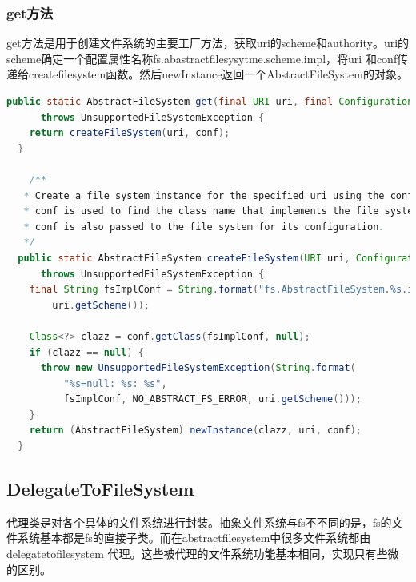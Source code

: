 \subsubsection{get方法}
get方法是用于创建文件系统的主要工厂方法，获取uri的scheme和authority。uri的scheme确定一个配置属性名称fs.abastractfilesysytme.scheme.impl，将uri 和conf传递给createfilesystem函数。然后newInstance返回一个AbstractFileSystem的对象。
\begin{lstlisting}[language=Java]
  public static AbstractFileSystem get(final URI uri, final Configuration conf)
      throws UnsupportedFileSystemException {
    return createFileSystem(uri, conf);
  }

    /**
   * Create a file system instance for the specified uri using the conf. The
   * conf is used to find the class name that implements the file system. The
   * conf is also passed to the file system for its configuration.
   */
  public static AbstractFileSystem createFileSystem(URI uri, Configuration conf)
      throws UnsupportedFileSystemException {
    final String fsImplConf = String.format("fs.AbstractFileSystem.%s.impl",
        uri.getScheme());

    Class<?> clazz = conf.getClass(fsImplConf, null);
    if (clazz == null) {
      throw new UnsupportedFileSystemException(String.format(
          "%s=null: %s: %s",
          fsImplConf, NO_ABSTRACT_FS_ERROR, uri.getScheme()));
    }
    return (AbstractFileSystem) newInstance(clazz, uri, conf);
  }
\end{lstlisting}






\subsection{DelegateToFileSystem}
代理类是对各个具体的文件系统进行封装。抽象文件系统与fs不不同的是，fs的文件系统基本都是fs的直接子类。而在abstractfilesystem中很多文件系统都由delegatetofilesystem 代理。这些被代理的文件系统功能基本相同，实现只有些微的区别。
